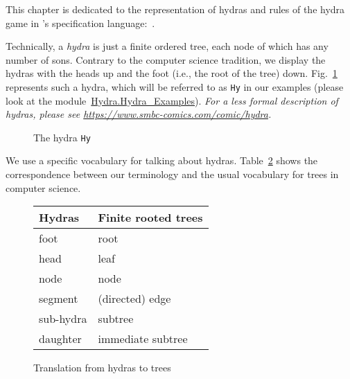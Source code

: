 This chapter is dedicated to the representation of hydras and rules of the hydra game in \coq's specification language:~\gallina. 


Technically, a \emph{hydra} is just a finite ordered tree, each node of which 
has any number of sons. Contrary to the computer science tradition, we display the hydras 
with the heads up and the foot (i.e., the root of the tree) down.
Fig.~\ref{fig:Hy} represents such  a hydra, which will be referred to as \texttt{Hy} in our examples (please look at the 
module~\href{../theories/html/hydras.Hydra.Hydra_Examples.html}{Hydra.Hydra\_Examples}). 
\emph{For a less formal description of hydras, please see 
\url{https://www.smbc-comics.com/comic/hydra}.}

\begin{figure}[h]
\centering
{}
\caption{The hydra \texttt{Hy} \label{fig:Hy}}
\end{figure}



We use a specific vocabulary for talking about hydras. Table~\ref{tab:hyd2tree} shows the correspondence between our terminology and the usual vocabulary for trees in computer science.


\begin{figure}[h]
  \centering
  \begin{tabular}{ll}
Hydras & Finite rooted trees\\
\hline
foot & root\\
head & leaf\\
node & node\\
segment  & (directed) edge \\
sub-hydra & subtree\\
daughter & immediate subtree\\
\end{tabular}
  \caption{Translation from hydras to trees}
  \label{tab:hyd2tree}
\end{figure}


